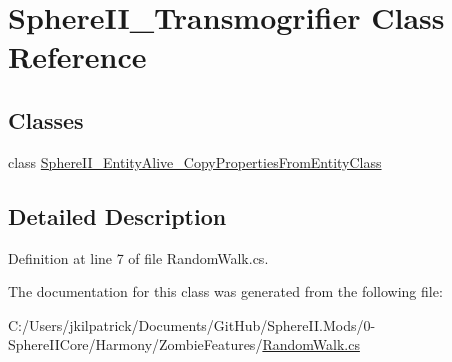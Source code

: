 \hypertarget{class_sphere_i_i___transmogrifier}{}\section{Sphere\+I\+I\+\_\+\+Transmogrifier Class Reference}
\label{class_sphere_i_i___transmogrifier}
\subsection*{Classes}
\begin{DoxyCompactItemize}
\item 
class \mbox{\hyperlink{class_sphere_i_i___transmogrifier_1_1_sphere_i_i___entity_alive___copy_properties_from_entity_class}{Sphere\+I\+I\+\_\+\+Entity\+Alive\+\_\+\+Copy\+Properties\+From\+Entity\+Class}}
\end{DoxyCompactItemize}


\subsection{Detailed Description}


Definition at line 7 of file Random\+Walk.\+cs.



The documentation for this class was generated from the following file\+:\begin{DoxyCompactItemize}
\item 
C\+:/\+Users/jkilpatrick/\+Documents/\+Git\+Hub/\+Sphere\+I\+I.\+Mods/0-\/\+Sphere\+I\+I\+Core/\+Harmony/\+Zombie\+Features/\mbox{\hyperlink{_random_walk_8cs}{Random\+Walk.\+cs}}\end{DoxyCompactItemize}
